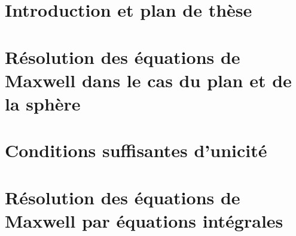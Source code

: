 \documentclass[11pt,%
draft,%
twoside,%
a4paper,%
openright %
]{book}
\author{\docauthor}
\title{\doctitle}
\begin{document}
\frontmatter
\hypersetup{pageanchor=false}
\begin{titlepage}
 \maketitle
\end{titlepage}
\hypersetup{pageanchor=true}

\setcounter{secnumdepth}{5} %
\setcounter{tocdepth}{1}  %
\dominitoc
\tableofcontents
\clearpage

\mainmatter
\chapter{Introduction et plan de thèse}


\setcounter{mtc}{2} %

\chapter{Résolution des équations de Maxwell dans le cas du plan et de la sphère}
\minitoc







\chapter{Conditions suffisantes d'unicité}
\minitoc


\chapter{Résolution des équations de Maxwell par équations intégrales}
\minitoc


\backmatter
\printbibliography
\end{document}

